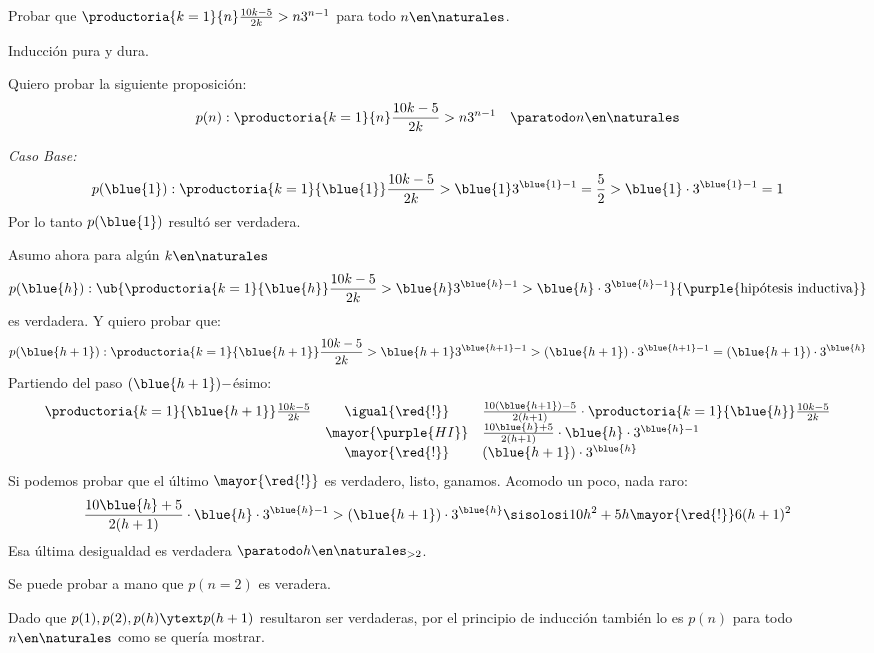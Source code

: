 \begin{enunciado}{\ejExtra}
  Probar que $\productoria{k=1}{n}\frac{10k - 5}{2k} > n 3^{n-1}$ para todo $n \en \naturales$.
\end{enunciado}

Inducción pura y dura.

\bigskip

Quiero probar la siguiente proposición:
$$
  p(n) :
  \productoria{k=1}{n}\frac{10k - 5}{2k} > n 3^{n-1} \quad \paratodo n \en \naturales
$$

\textit{Caso Base:}
$$
  p(\blue{1}) :
  \productoria{k=1}{\blue{1}}\frac{10k - 5}{2k} > \blue{1} 3^{\blue{1}-1}  = \frac{5}{2} > \blue{1} \cdot 3^{\blue{1} - 1} = 1
$$
Por lo tanto $p(\blue{1})$ resultó ser verdadera.

\medskip

Asumo ahora para algún $k \en \naturales$
$$
  p(\blue{h}) :
  \ub{\productoria{k=1}{\blue{h}}\frac{10k - 5}{2k} > \blue{h} 3^{\blue{h}-1}
    >
    \blue{h} \cdot 3^{\blue{h} - 1}}{\text{\purple{hipótesis inductiva}}}
$$
es verdadera. Y quiero probar que:
$$
  p(\blue{h+1}) : \productoria{k=1}{\blue{h+1}}\frac{10k - 5}{2k} > \blue{h+1} 3^{\blue{h+1}-1}
  >
  (\blue{h+1}) \cdot 3^{\blue{h+1} - 1} =
  (\blue{h+1}) \cdot 3^{\blue{h}}
$$
Partiendo del paso $(\blue{h + 1})-$ésimo:
$$
  \begin{array}{rcl}
    \productoria{k=1}{\blue{h+1}}\frac{10k - 5}{2k}
     & \igual{\red{!}}     &
    \frac{10(\blue{h+1}) - 5}{2(h+1)} \cdot
    \productoria{k=1}{\blue{h}}\frac{10k - 5}{2k}                    \\
     & \mayor{\purple{HI}} &
    \frac{10\blue{h} + 5}{2(h+1)} \cdot \blue{h}\cdot 3^{\blue{h}-1} \\
     & \mayor{\red{!}}     &
    (\blue{h+1}) \cdot 3^{\blue{h}}
  \end{array}
$$
Si podemos probar que el último $\mayor{\red{!}}$ es verdadero, listo, ganamos. Acomodo un poco, nada raro:
$$
  \frac{10\blue{h} + 5}{2(h+1)} \cdot \blue{h}\cdot 3^{\blue{h}-1}
  >
  (\blue{h+1}) \cdot 3^{\blue{h}}
  \sisolosi
  10h^2 + 5h \mayor{\red{!}} 6(h+1)^2
$$
Esa última desigualdad es verdadera $ \paratodo h\en \naturales_{>2}$.
  {\small
  }

Se puede probar a mano que $p(n = 2)$ es veradera.

Dado que $p(1), p(2), p(h) \ytext p(h+1)$ resultaron ser verdaderas, por el principio de inducción también lo es $p(n)$ para todo $n \en \naturales$ como se
quería mostrar.

\begin{aportes}
  \item {}
\end{aportes}

